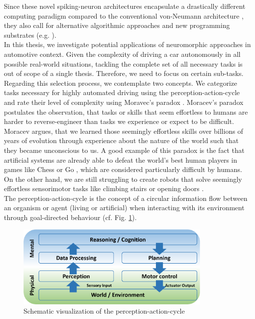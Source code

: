 Since these novel spiking-neuron architectures encapsulate a drastically different computing paradigm compared to the conventional von-Neumann architecture \cite{vonNeumann1993}, they also call for alternative algorithmic approaches and new programming substrates (e.g. \cite{Amir2013}).\\
In this thesis, we investigate potential applications of neuromorphic approaches in automotive context.
Given the complexity of driving a car autonomously in all possible real-world situations, tackling the complete set of all necessary tasks is out of scope of a single thesis.
Therefore, we need to focus on certain sub-tasks.
Regarding this selection process, we contemplate two concepts.
We categorize tasks necessary for highly automated driving using the perception-action-cycle and rate their level of complexity using Moravec's paradox \cite{Moravec1988}.
Moracev's paradox postulates the observation, that tasks or skills that seem effortless to humans are harder to reverse-engineer than tasks we experience or expect to be difficult.
Moracev argues, that we learned those seemingly effortless skills over billions of years of evolution through experience about the nature of the world such that they became unconscious to us.
A good example of this paradox is the fact that artificial systems are already able to defeat the world's best human players in games like Chess \cite{Hsu2002} or Go \cite{Silver2016}, which are considered particularly difficult by humans.
On the other hand, we are still struggling to create robots that solve seemingly effortless sensorimotor tasks like climbing stairs or opening doors \cite{Guizzo2015, Norton2017}.\\
The perception-action-cycle \cite{Fuster2004} is the concept of a circular information flow between an organism or agent (living or artificial) when interacting with its environment through goal-directed behaviour (cf. Fig. \ref{fig:perc-act-cicle}).
\begin{figure}[t!]
	\centering
	\includegraphics[width=0.85\textwidth]{imgs/ActionPerceptionCycle.eps}
	\caption{Schematic visualization of the perception-action-cycle}
	\label{fig:perc-act-cicle}
\end{figure}
